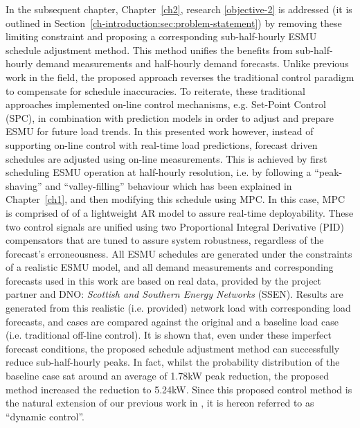 In the subsequent chapter, Chapter~\ref{ch2}, research \ref{objective-2} is addressed (it is outlined in Section~\ref{ch-introduction:sec:problem-statement}) by removing these limiting constraint and proposing a corresponding sub-half-hourly ESMU schedule adjustment method.
This method unifies the benefits from sub-half-hourly demand measurements and half-hourly demand forecasts.
Unlike previous work in the field, the proposed approach reverses the traditional control paradigm to compensate for schedule inaccuracies.
To reiterate, these traditional approaches implemented on-line control mechanisms, e.g. Set-Point Control (SPC), in combination with prediction models in order to adjust and prepare ESMU for future load trends.
In this presented work however, instead of supporting on-line control with real-time load predictions, forecast driven schedules are adjusted using on-line measurements.
This is achieved by first scheduling ESMU operation at half-hourly resolution, i.e. by following a ``peak-shaving'' and ``valley-filling'' behaviour which has been explained in Chapter~\ref{ch1}, and then modifying this schedule using MPC.
In this case, MPC is comprised of of a lightweight AR model to assure real-time deployability.
These two control signals are unified using two Proportional Integral Derivative (PID) compensators that are tuned to assure system robustness, regardless of the forecast's erroneousness.
All ESMU schedules are generated under the constraints of a realistic ESMU model, and all demand measurements and corresponding forecasts used in this work are based on real data, provided by the project partner and DNO: \textit{Scottish and Southern Energy Networks} (SSEN).
Results are generated from this realistic (i.e. provided) network load with corresponding load forecasts, and cases are compared against the original and a baseline load case (i.e. traditional off-line control).
It is shown that, even under these imperfect forecast conditions, the proposed schedule adjustment method can successfully reduce sub-half-hourly peaks.
In fact, whilst the probability distribution of the baseline case sat around an average of 1.78kW peak reduction, the proposed method increased the reduction to 5.24kW.
Since this proposed control method is the natural extension of our previous work in \cite{Zangs2016}, it is hereon referred to as ``dynamic control''.

